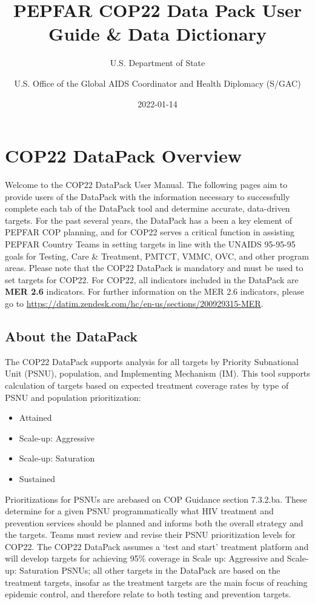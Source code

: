 \documentclass[
  openany]{book}
\title{PEPFAR COP22 Data Pack User Guide \& Data Dictionary}
\author{U.S. Department of State \and U.S. Office of the Global AIDS Coordinator and Health Diplomacy (S/GAC)}
\date{2022-01-14}
\begin{document}
\maketitle

\newpage

{
\hypersetup{linkcolor=}
\setcounter{tocdepth}{1}
\tableofcontents
}
\hypertarget{cop22-datapack-overview}{%
\chapter{COP22 DataPack Overview}\label{cop22-datapack-overview}}

Welcome to the COP22 DataPack User Manual. The following pages aim to
provide users of the DataPack with the information necessary to
successfully complete each tab of the DataPack tool and determine
accurate, data-driven targets. For the past several years, the DataPack
has a been a key element of PEPFAR COP planning, and for COP22 serves a
critical function in assisting PEPFAR Country Teams in setting targets
in line with the UNAIDS 95-95-95 goals for Testing, Care \& Treatment,
PMTCT, VMMC, OVC, and other program areas. Please note that the COP22
DataPack is mandatory and must be used to set targets for COP22. For
COP22, all indicators included in the DataPack are \textbf{MER 2.6}
indicators. For further information on the MER 2.6 indicators, please go
to \url{https://datim.zendesk.com/hc/en-us/sections/200929315-MER}.

\hypertarget{about-the-datapack}{%
\section{About the DataPack}\label{about-the-datapack}}

The COP22 DataPack supports analysis for all targets by Priority
Subnational Unit (PSNU), population, and Implementing Mechanism (IM).
This tool supports calculation of targets based on expected treatment
coverage rates by type of PSNU and population prioritization:

\begin{itemize}
\item
  Attained
\item
  Scale-up: Aggressive
\item
  Scale-up: Saturation
\item
  Sustained
\end{itemize}

Prioritizations for PSNUs are arebased on COP Guidance section 7.3.2.ba.
These determine for a given PSNU programmatically what HIV treatment and
prevention services should be planned and informs both the overall
strategy and the targets. Teams must review and revise their PSNU
prioritization levels for COP22. The COP22 DataPack assumes a `test and
start' treatment platform and will develop targets for achieving 95\%
coverage in Scale up: Aggressive and Scale-up: Saturation PSNUs; all
other targets in the DataPack are based on the treatment targets,
insofar as the treatment targets are the main focus of reaching epidemic
control, and therefore relate to both testing and prevention targets.
\end{document}

